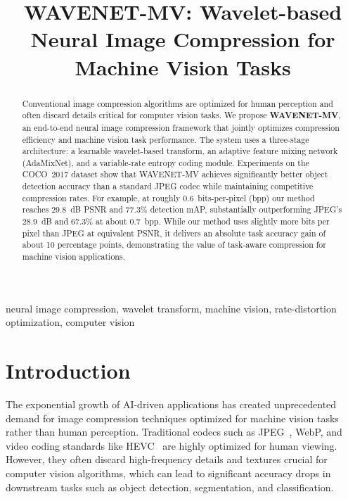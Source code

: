 \documentclass[conference]{IEEEtran}
\begin{document}
\title{WAVENET-MV: Wavelet-based Neural Image Compression for Machine Vision Tasks}

\author{
}
\maketitle

\begin{abstract}
Conventional image compression algorithms are optimized for human perception and often discard details critical for computer vision tasks. We propose \textbf{WAVENET-MV}, an end-to-end neural image compression framework that jointly optimizes compression efficiency and machine vision task performance. The system uses a three-stage architecture: a learnable wavelet-based transform, an adaptive feature mixing network (AdaMixNet), and a variable-rate entropy coding module. Experiments on the COCO~2017 dataset show that WAVENET-MV achieves significantly better object detection accuracy than a standard JPEG codec while maintaining competitive compression rates. For example, at roughly 0.6~bits-per-pixel (bpp) our method reaches 29.8~dB PSNR and 77.3\% detection mAP, substantially outperforming JPEG's 28.9~dB and 67.3\% at about 0.7~bpp. While our method uses slightly more bits per pixel than JPEG at equivalent PSNR, it delivers an absolute task accuracy gain of about 10 percentage points, demonstrating the value of task-aware compression for machine vision applications.
\end{abstract}

\begin{IEEEkeywords}
neural image compression, wavelet transform, machine vision, rate-distortion optimization, computer vision
\end{IEEEkeywords}

\section{Introduction}

The exponential growth of AI-driven applications has created unprecedented demand for image compression techniques optimized for machine vision tasks rather than human perception. Traditional codecs such as JPEG~\cite{wallace1992jpeg}, WebP, and video coding standards like HEVC~\cite{sullivan2012hevc} are highly optimized for human viewing. However, they often discard high-frequency details and textures crucial for computer vision algorithms, which can lead to significant accuracy drops in downstream tasks such as object detection, segmentation, and classification.
\end{document}
